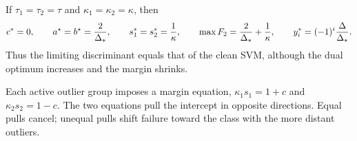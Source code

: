 \begin{corollary}\label{cor:symmetric}
If $\tau_1=\tau_2=\tau$ and $\kappa_1=\kappa_2=\kappa$, then
\[
c^*=0,\qquad a^{\star}=b^{\star}={2\over\Delta_*},\qquad
s_1^*=s_2^*={1\over\kappa},\qquad
\max F_2={2\over\Delta_*}+{1\over\kappa},\qquad
 y_i^*=(-1)^i{\Delta\over\Delta_*}.
\]
Thus the limiting discriminant equals that of the clean SVM, although the dual optimum increases and the margin shrinks.
\end{corollary}

\begin{remark}
Each active outlier group imposes a margin equation, $\kappa_1s_1=1+c$ and $\kappa_2s_2=1-c$. The two equations pull the intercept in opposite directions. Equal pulls cancel; unequal pulls shift failure toward the class with the more distant outliers.
\end{remark}
